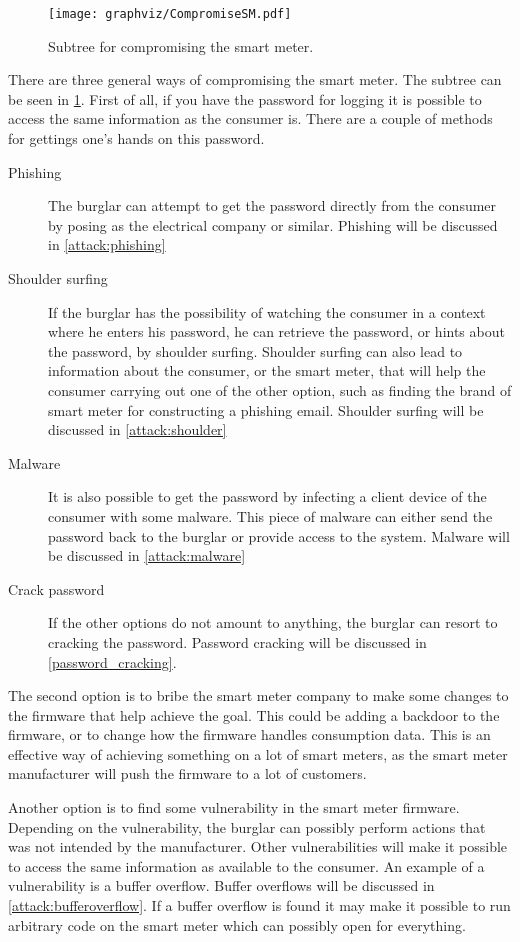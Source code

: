 \begin{figure}[H]
\center
\texttt{[image: graphviz/CompromiseSM.pdf]}
\caption{Subtree for compromising the smart meter.}
\label{attacktree:compromiseSM}
\end{figure}

There are three general ways of compromising the smart meter.
The subtree can be seen in \cref{attacktree:compromiseSM}.
First of all, if you have the password for logging it is possible to access the same information as the consumer is.
There are a couple of methods for gettings one's hands on this password. 
\begin{description}
	\item[Phishing] The burglar can attempt to get the password directly from the consumer by posing as the electrical company or similar. Phishing will be discussed in \cref{attack:phishing}
	\item [Shoulder surfing] If the burglar has the possibility of watching the consumer in a context where he enters his password, he can retrieve the password, or hints about the password, by shoulder surfing. 
	Shoulder surfing can also lead to information about the consumer, or the smart meter, that will help the consumer carrying out one of the other option, such as finding the brand of smart meter for constructing a phishing email.
	Shoulder surfing will be discussed in \cref{attack:shoulder}
	\item [Malware] It is also possible to get the password by infecting a client device of the consumer with some malware.
  This piece of malware can either send the password back to the burglar or provide access to the system.
  Malware will be discussed in \cref{attack:malware}
	\item [Crack password] If the other options do not amount to anything, the burglar can resort to cracking the password.
	Password cracking will be discussed in \cref{password_cracking}.
\end{description}

The second option is to bribe the smart meter company to make some changes to the firmware that help achieve the goal.
This could be adding a backdoor to the firmware, or to change how the firmware handles consumption data.
This is an effective way of achieving something on a lot of smart meters, as the smart meter manufacturer will push the firmware to a lot of customers.

Another option is to find some vulnerability in the smart meter firmware.
Depending on the vulnerability, the burglar can possibly perform actions that was not intended by the manufacturer.
Other vulnerabilities will make it possible to access the same information as available to the consumer.
An example of a vulnerability is a buffer overflow.
Buffer overflows will be discussed in \cref{attack:bufferoverflow}.
If a buffer overflow is found it may make it possible to run arbitrary code on the smart meter which can possibly open for everything.


